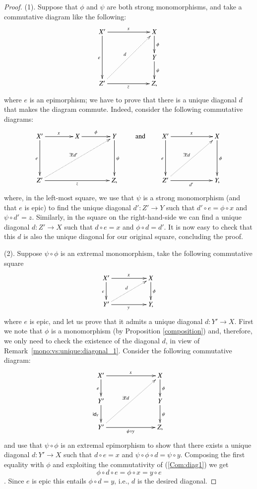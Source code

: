 \documentclass[12pt]{article}
\theoremstyle{definition}
\numberwithin{equation}{section}
\newcommand{\id}[1]{\mathsf{id}_{#1}}
\begin{document}
\begin{proof}
(1). Suppose  that $\phi$ and  $\psi$ are both strong monomorphisms, and take a commutative diagram like the following:
\[
\xymatrix@C=60pt{
X'\ar[dd]_{e}\ar[r]^x&X\ar[d]^\phi\\
&Y\ar[d]^\psi\\
Z'\ar@{.>}[ruu]^d\ar[r]_z&Z,
}
\]
where $e$ is an epimorphism; we have to prove that there is a unique diagonal $d$ that makes the diagram commute. Indeed, consider the following commutative diagrams:
\[
\xymatrix@C=40pt@R=50pt{
X'\ar[d]_{e}\ar[r]^x&X\ar[r]^\phi&Y\ar[d]^\psi\\
Z'\ar@{.>}[rru]^{\exists!d'}\ar[rr]_z&&Z,
}
\qquad\text{and}\qquad
\xymatrix@R=50pt@C=60pt{
X'\ar[d]_{e}\ar[r]^x&X\ar[d]^\phi\\
Z'\ar@{.>}[ru]^{\exists!d}\ar[r]_{d'}&Y,
}
\]
where, in the left-most square, we use that $\psi$ is a strong monomorphism (and that $e$ is epic) to find the unique diagonal $d'\colon Z'\to Y$ such that  $d'\circ e=\phi\circ x$ and $\psi\circ d'=z$. Similarly, in the square on the right-hand-side we can find a unique diagonal $d\colon Z'\to X$ such that $d\circ e=x$ and $\phi\circ d=d'$. It is now easy to check that this $d$ is also the unique diagonal for our original square, concluding the proof.

\smallskip\noindent
(2). Suppose  $\psi\circ\phi$ is an extremal monomorphism, take the following commutative square
\begin{equation}\label{Com:diag1}
\xymatrix@C=50pt{
X'\ar[r]^x\ar[d]_e&X\ar[d]^\phi\\
Y'\ar[r]_y\ar@{.>}[ur]^d&Y,
}
\end{equation}
where $e$ is epic, and let us prove that it admits a unique diagonal $d\colon Y'\to X$. First we note that  $\phi$ is a monomorphism (by Proposition \ref{composition}) and, therefore, we only need to check the existence of the diagonal $d$, in view of Remark~\ref{mono:vs:unique:diagonal_1}.  Consider the following commutative diagram:
\[
\xymatrix@C=70pt{
X'\ar[r]^x\ar[d]_e&X\ar[d]^\phi\\
Y'\ar@{>}[d]_{\id{Y}}&Y\ar[d]^\psi\\
Y'\ar@{.>}[uur]^{\exists!d}\ar[r]_{\psi\circ y}&Z,
}
\]
and use that $\psi\circ \phi$ is an extremal epimorphism to show that there exists a unique diagonal $d\colon Y'\to X$ such that $d\circ e=x$ and $\psi\circ\phi\circ d=\psi\circ y$. Composing the first equality with $\phi$ and exploiting the commutativity of (\ref{Com:diag1}) we get  \[\phi \circ d\circ e=\phi \circ x =y \circ e\]. Since $e$ is epic this entails $\phi \circ d=y$, i.e., $d$ is the desired diagonal.
\end{proof}
\end{document}
